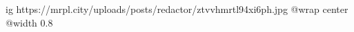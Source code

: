  
 
 
 
 

\ifcmt
  ig https://mrpl.city/uploads/posts/redactor/ztvvhmrtl94xi6ph.jpg
  @wrap center
  @width 0.8
\fi
